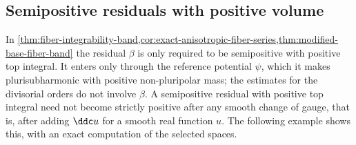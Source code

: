 \subsection{Semipositive residuals with positive volume}
\label{sec:semipositive-fiber-integrability}

In \cref{thm:fiber-integrability-band,cor:exact-anisotropic-fiber-series,thm:modified-base-fiber-band} the residual $\beta$ is only required to be semipositive with positive top integral. It enters only through the reference potential $\psi$, which it makes plurisubharmonic with positive non-pluripolar mass; the estimates for the divisorial orders do not involve $\beta$. A semipositive residual with positive top integral need not become strictly positive after any smooth change of gauge, that is, after adding $\ddc u$ for a smooth real function $u$. The following example shows this, with an exact computation of the selected spaces.

